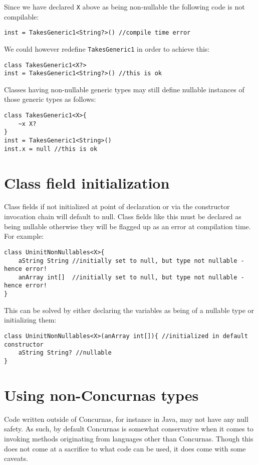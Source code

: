 \documentclass[conc-doc]{subfiles}
\begin{document}
Since we have declared \lstinline{X} above as being non-nullable the following code is not compilable:
\begin{lstlisting}
inst = TakesGeneric1<String?>() //compile time error
\end{lstlisting}

We could however redefine \lstinline{TakesGeneric1} in order to achieve this:

\begin{lstlisting}
class TakesGeneric1<X?>
inst = TakesGeneric1<String?>() //this is ok
\end{lstlisting}

Classes having non-nullable generic types may still define nullable instances of those generic types as follows:

\begin{lstlisting}
class TakesGeneric1<X>{
	~x X?
}
inst = TakesGeneric1<String>()
inst.x = null //this is ok
\end{lstlisting}


\section{Class field initialization}
Class fields if not initialized at point of declaration or via the constructor invocation chain will default to null. Class fields like this must be declared as being nullable otherwise they will be flagged up as an error at compilation time. For example:
\begin{lstlisting}
class UninitNonNullables<X>{
	aString String //initially set to null, but type not nullable - hence error!
	anArray int[]  //initially set to null, but type not nullable - hence error!
}
\end{lstlisting}

This can be solved by either declaring the variables as being of a nullable type or initializing them:

\begin{lstlisting}
class UninitNonNullables<X>(anArray int[]){ //initialized in default constructor
	aString String? //nullable
}
\end{lstlisting}

\section{Using non-Concurnas types}
Code written outside of Concurnas, for instance in Java, may not have any null safety. As such, by default Concurnas is somewhat conservative when it comes to invoking methods originating from languages other than Concurnas. Though this does not come at a sacrifice to what code can be used, it does come with some caveats.
\end{document}
